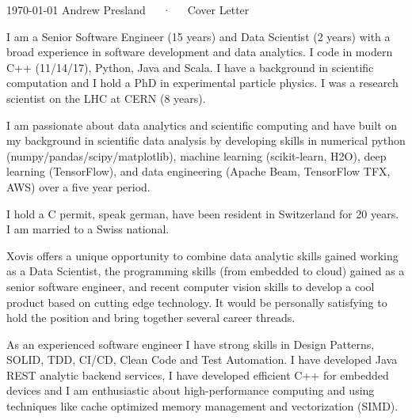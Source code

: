 \documentclass[11pt, a4paper]{awesome-cv}
\begin{document}
\makecvheader[R]

\makecvfooter
  {\today}
  {Andrew Presland~~~·~~~Cover Letter}
  {}

\makelettertitle

\begin{cvletter}

I am a Senior Software Engineer (15 years) and Data Scientist (2 years) with a broad experience 
in software development and data analytics.
I code in modern C++ (11/14/17), Python, Java
and Scala. I have a background in scientific computation and
I hold a PhD in experimental particle physics. I was a research scientist 
on the LHC at CERN (8 years).

I am passionate about data analytics and scientific computing and have
built on my background in scientific data analysis by developing skills 
in numerical python (numpy/pandas/scipy/matplotlib), machine learning (scikit-learn, H2O), deep learning (TensorFlow),
and data engineering (Apache Beam, TensorFlow TFX, AWS) over a five year period.

I hold a C permit, 
speak german, have been resident in Switzerland for 20 years.
I am married to a Swiss national.

Xovis offers a unique opportunity to combine data analytic skills gained working as 
a Data Scientist, the programming skills (from embedded to cloud) gained as 
a senior software engineer, and recent computer vision skills to develop 
a cool product based on cutting edge technology. It would be personally satisfying 
to hold the position and bring together several career threads. 



As an experienced software engineer I have strong skills in 
Design Patterns, SOLID, TDD, CI/CD, Clean Code and Test Automation.
I have developed Java REST analytic backend services, I 
have developed efficient C++ for embedded devices and
I am enthusiastic about high-performance computing and using 
techniques like cache optimized memory management 
and vectorization (SIMD).


\end{cvletter}
\end{document}
